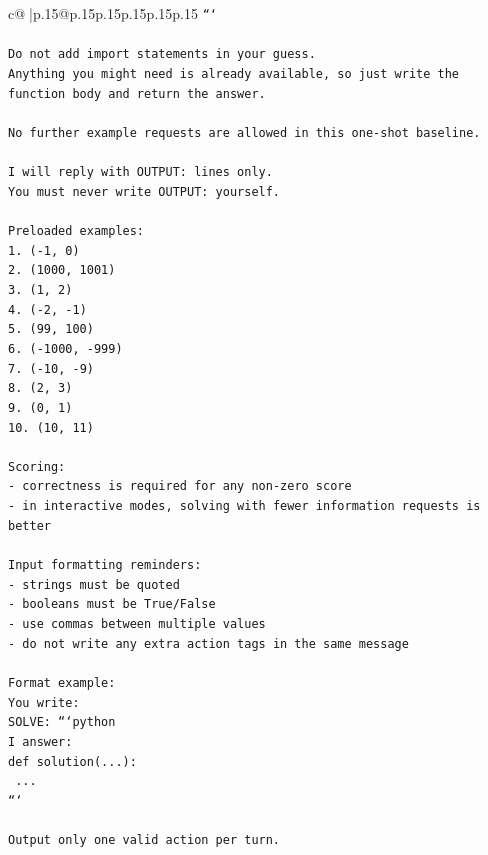 \documentclass{article}
\begin{document}
{\begin{supertabular}{c@{$\;$}|p{.15\linewidth}@{}p{.15\linewidth}p{.15\linewidth}p{.15\linewidth}p{.15\linewidth}p{.15\linewidth}}
{{{\texttt{```} \\
\\ 
\texttt{Do not add import statements in your guess.} \\
\texttt{Anything you might need is already available, so just write the function body and return the answer.} \\
\\ 
\texttt{No further example requests are allowed in this one{-}shot baseline.} \\
\\ 
\texttt{I will reply with OUTPUT: lines only.} \\
\texttt{You must never write OUTPUT: yourself.} \\
\\ 
\texttt{Preloaded examples:} \\
\texttt{1. ({-}1, 0)} \\
\texttt{2. (1000, 1001)} \\
\texttt{3. (1, 2)} \\
\texttt{4. ({-}2, {-}1)} \\
\texttt{5. (99, 100)} \\
\texttt{6. ({-}1000, {-}999)} \\
\texttt{7. ({-}10, {-}9)} \\
\texttt{8. (2, 3)} \\
\texttt{9. (0, 1)} \\
\texttt{10. (10, 11)} \\
\\ 
\texttt{Scoring:} \\
\texttt{{-} correctness is required for any non{-}zero score} \\
\texttt{{-} in interactive modes, solving with fewer information requests is better} \\
\\ 
\texttt{Input formatting reminders:} \\
\texttt{{-} strings must be quoted} \\
\texttt{{-} booleans must be True/False} \\
\texttt{{-} use commas between multiple values} \\
\texttt{{-} do not write any extra action tags in the same message} \\
\\ 
\texttt{Format example:} \\
\texttt{You write:} \\
\texttt{SOLVE: ```python} \\
\texttt{I answer:} \\
\texttt{def solution(...):} \\
\texttt{    ...} \\
\texttt{```} \\
\\ 
\texttt{Output only one valid action per turn.} \\
            }
        }
    }
     \\ \\


\end{supertabular}}
\end{document}
